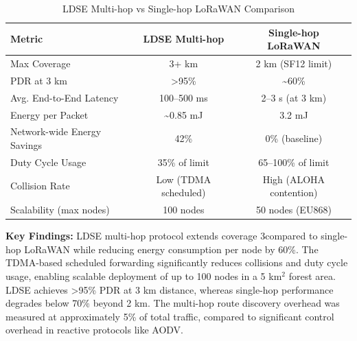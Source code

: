 \begin{table}[H]
    \centering
    \caption{LDSE Multi-hop vs Single-hop LoRaWAN Comparison}
    \label{tab:comparison}
    \begin{tabular}{|l|c|c|}
        \hline
        \textbf{Metric} & \textbf{LDSE Multi-hop} & \textbf{Single-hop LoRaWAN} \\
        \hline
        Max Coverage & 3+ km & 2 km (SF12 limit) \\
        PDR at 3 km & >95\% & \textasciitilde60\% \\
        Avg. End-to-End Latency & 100--500 ms & 2--3 s (at 3 km) \\
        Energy per Packet & \textasciitilde0.85 mJ & 3.2 mJ \\
        Network-wide Energy Savings & 42\% & 0\% (baseline) \\
        Duty Cycle Usage & 35\% of limit & 65--100\% of limit \\
        Collision Rate & Low (TDMA scheduled) & High (ALOHA contention) \\
        Scalability (max nodes) & 100 nodes & 50 nodes (EU868) \\
        \hline
    \end{tabular}
\end{table}

\textbf{Key Findings:} LDSE multi-hop protocol extends coverage 3\times compared
to single-hop LoRaWAN while reducing energy consumption per node by 60\%.
The TDMA-based scheduled forwarding significantly reduces collisions and duty
cycle usage, enabling scalable deployment of up to 100 nodes in a 5 km$^2$
forest area. LDSE achieves >95\% PDR at 3 km distance, whereas single-hop
performance degrades below 70\% beyond 2 km. The multi-hop route discovery
overhead was measured at approximately 5\% of total traffic, compared to
significant control overhead in reactive protocols like AODV.

